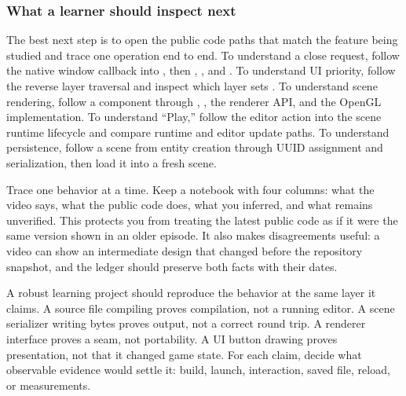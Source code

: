 \subsubsection{What a learner should inspect next}\label{06-engine-ii-ch042-what-a-learner-should-inspect-next}

\hypertarget{06-engine-ii-ch042-what-a-learner-should-inspect-next}{}

The best next step is to open the public code paths that match the feature being studied and trace one operation end to end. To understand a close request, follow the native window callback into , then , , and . To understand UI priority, follow the reverse layer traversal and inspect which layer sets . To understand scene rendering, follow a component through , , the renderer API, and the OpenGL implementation. To understand ``Play,'' follow the editor action into the scene runtime lifecycle and compare runtime and editor update paths. To understand persistence, follow a scene from entity creation through UUID assignment and serialization, then load it into a fresh scene.

Trace one behavior at a time. Keep a notebook with four columns: what the video says, what the public code does, what you inferred, and what remains unverified. This protects you from treating the latest public code as if it were the same version shown in an older episode. It also makes disagreements useful: a video can show an intermediate design that changed before the repository snapshot, and the ledger should preserve both facts with their dates.

A robust learning project should reproduce the behavior at the same layer it claims. A source file compiling proves compilation, not a running editor. A scene serializer writing bytes proves output, not a correct round trip. A renderer interface proves a seam, not portability. A UI button drawing proves presentation, not that it changed game state. For each claim, decide what observable evidence would settle it: build, launch, interaction, saved file, reload, or measurements.

